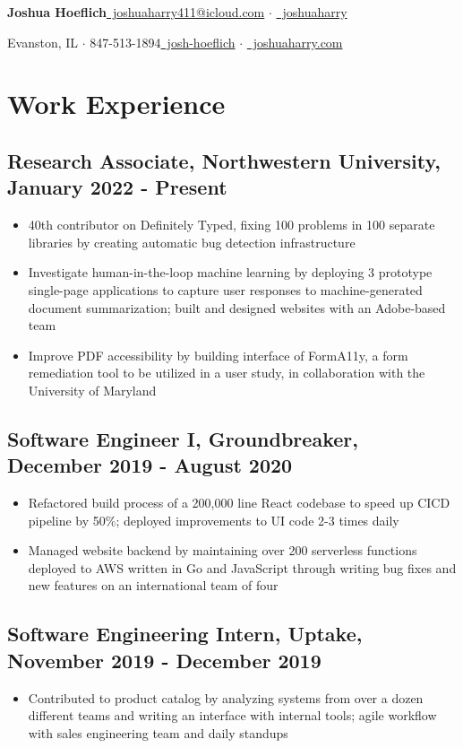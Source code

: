 \documentclass[letterpaper]{article}
\newcommand{\bigdot}{{\large $\cdot$ }}
\begin{document}
{\Large \textbf{Joshua Hoeflich}}\hfill \href{mailto:joshuahoeflich2021@u.northwestern.edu}{{\small \faEnvelope}~joshuaharry411@icloud.com} \bigdot
\href{https://github.com/joshuaharry}{{\small \faGithub}~joshuaharry}

{\normalsize Evanston, IL $\cdot$ 847-513-1894}\hfill \href{https://www.linkedin.com/in/josh-hoeflich/}{{\small \faLinkedinSquare}~josh-hoeflich} $\cdot$ \href{https://joshuaharry.com}{{\small \faGlobe}~joshuaharry.com}
\section*{Work Experience}
\subsection*{Research Associate, Northwestern University, January 2022 - Present}
\begin{itemize}
\item 40th contributor on Definitely Typed, fixing 100 problems in 100 separate libraries by creating automatic bug detection infrastructure
\item Investigate human-in-the-loop machine learning by deploying 3 prototype single-page applications to capture user responses to machine-generated document summarization; built and designed websites with an Adobe-based team
\item Improve PDF accessibility by building interface of FormA11y, a form remediation tool to be utilized in a user study, in collaboration with the University of Maryland
\end{itemize}
\subsection*{Software Engineer I, Groundbreaker, December 2019 - August 2020}
\begin{itemize}
\item Refactored build process of a 200,000 line React codebase to speed up CICD pipeline by 50\%; deployed improvements to UI code 2-3 times daily
\item Managed website backend by maintaining over 200 serverless functions deployed to AWS written in Go and JavaScript through writing bug fixes and new features on an international team of four
\end{itemize}
\subsection*{Software Engineering Intern, Uptake, November 2019 - December 2019}
\begin{itemize}
  \item Contributed to product catalog by analyzing systems from over a dozen different teams and writing an interface with internal tools; agile workflow with sales engineering team and daily standups
\end{itemize}
\end{document}
